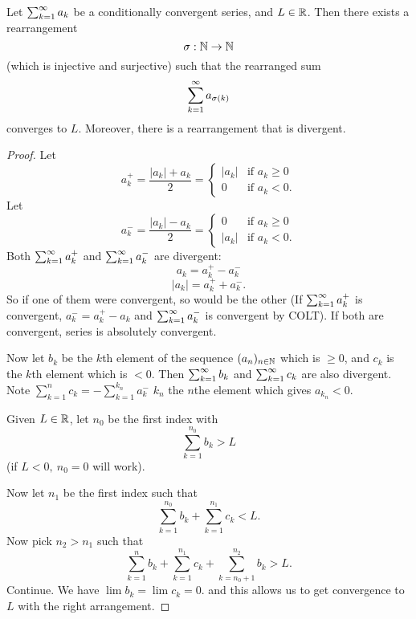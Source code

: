 \documentclass[10pt, a4paper]{article}
\newcommand{\seq}[1][x]{(#1_n)_{n \in \N}}
\begin{document}
\begin{theorem}
    Let $\sum_{k = 1}^{\infty} a_k$ be a conditionally convergent series,
    and $L \in \mathbb{R}$.
    Then there exists a rearrangement
    \[
    \sigma : \mathbb{N} \rightarrow \mathbb{N}
    \]
    (which is injective and surjective)
    such that the rearranged sum
    \[
    \sum_{k = 1}^{\infty} a_{\sigma(k)}
    \]
    converges to $L$.
    Moreover,
    there is a rearrangement that is divergent.
    \begin{proof}
        Let
        \[
        a_k^{+} = \frac{|a_k| + a_k}{2} = \begin{cases}
            |a_k| & \text{if } a_k \geq 0 \\
            0 & \text{if } a_k < 0.
        \end{cases}
        \]
        Let
        \[
        a_k^{-} = \frac{|a_k| - a_k}{2} = \begin{cases}
            0 & \text{if } a_k \geq 0 \\
            |a_k| & \text{if } a_k < 0.
        \end{cases}
        \]
        Both $\sum_{k = 1}^{\infty} a_k^{+}$ and $\sum_{k = 1}^{\infty} a_k^{-}$ are divergent:
        \[
        a_k = a_k^{+} - a_k^{-}
        \]
        \[
        |a_k| = a_k^{+} + a_k^{-}.
        \]
        So if one of them were convergent,
        so would be the other
        (If $\sum_{k = 1}^{\infty} a_k^{+}$ is convergent,
        $a_k^{-} = a_k^{+} - a_k$ and $\sum_{k = 1}^{\infty} a_k^{-}$ is convergent by COLT).
        If both are convergent,
        series is absolutely convergent.

        Now let $b_k$ be the $k$th element of the sequence $\seq[a]$ which is $\geq 0$,
        and $c_k$ is the $k$th element which is $< 0$.
        Then $\sum_{k = 1}^{\infty} b_k$ and $\sum_{k = 1}^{\infty} c_k$ are also divergent.
        Note $\sum_{k = 1}^{n}c_k = -\sum_{k = 1}^{k_n}a_k^{-}$
        $k_n$ the $n$the element which gives $a_{k_n} < 0$.

        Given $L \in \mathbb{R}$,
        let $n_0$ be the first index with
        \[
        \sum_{k = 1}^{n_0}b_k > L
        \]
        (if $L < 0,\ n_0 = 0$ will work).

        Now let $n_1$ be the first index such that
        \[
        \sum_{k = 1}^{n_0}b_k + \sum_{k = 1}^{n_1}c_k < L.
        \]
        Now pick $n_2 > n_1$ such that
        \[
        \sum_{k = 1}^{n}b_k + \sum_{k = 1}^{n_1}c_k + \sum_{k = n_0 + 1}^{n_2}b_k > L.
        \]
        Continue.
        We have $\lim b_k = \lim c_k = 0$.
        and this allows us to get convergence to $L$ with the right arrangement.
    \end{proof}
\end{theorem}
\end{document}
